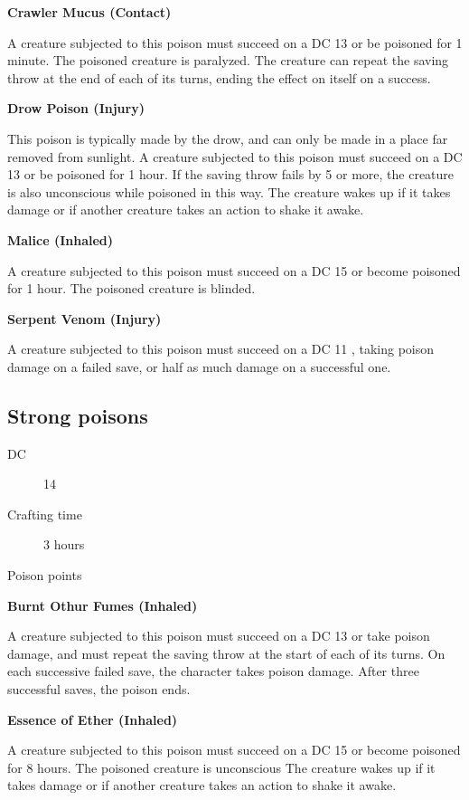 \textbf{Crawler Mucus (Contact)}

A creature subjected to this poison must succeed on a DC 13 \constitutionsave or be poisoned for 1 minute. The poisoned creature is paralyzed. The creature can repeat the saving throw at the end of each of its turns, ending the effect on itself on a success.

\textbf{Drow Poison (Injury)}

This poison is typically made by the drow, and can only be made in a place far removed from sunlight. A creature subjected to this poison must succeed on a DC 13 \constitutionsave or be poisoned for 1 hour. If the saving throw fails by 5 or more, the creature is also unconscious while poisoned in this way. The creature wakes up if it takes damage or if another creature takes an action to shake it awake.

\textbf{Malice (Inhaled)}

A creature subjected to this poison must succeed on a DC 15 \constitutionsave or become poisoned for 1 hour. The poisoned creature is blinded.

\textbf{Serpent Venom (Injury)}

A creature subjected to this poison must succeed on a DC 11 \constitutionsave, taking  poison damage on a failed save, or half as much damage on a successful one.

\subsection{Strong poisons}

\begin{description}
\item [DC] 14 \nature
\item [Crafting time] 3 hours
\item [Poison points] \poison\poison\poison
\end{description}

\textbf{Burnt Othur Fumes (Inhaled)}

A creature subjected to this poison must succeed on a DC 13 \constitutionsave or take  poison damage, and must repeat the saving throw at the start of each of its turns. On each successive failed save, the character takes  poison damage. After three successful saves, the poison ends.

\textbf{Essence of Ether (Inhaled)}

A creature subjected to this poison must succeed on a DC 15 \constitutionsave or become poisoned for 8 hours. The poisoned creature is unconscious The creature wakes up if it takes damage or if another creature takes an action to shake it awake.

